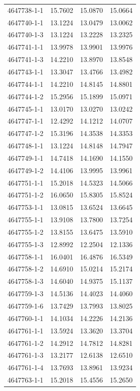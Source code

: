 \begin{longtable}{lrrr}
4647738-1-1 & 15.7602 & 15.0870 & 15.0664 \\
4647740-1-1 & 13.1224 & 13.0479 & 13.0062 \\
4647740-1-3 & 13.1224 & 13.2228 & 13.2325 \\
4647741-1-1 & 13.9978 & 13.9901 & 13.9976 \\
4647741-1-3 & 14.2210 & 13.8970 & 13.8548 \\
4647743-1-1 & 13.3047 & 13.4766 & 13.4982 \\
4647744-1-1 & 14.2210 & 14.8145 & 14.8801 \\
4647744-1-2 & 15.2956 & 15.1899 & 15.0971 \\
4647745-1-1 & 13.0170 & 13.0270 & 13.0242 \\
4647747-1-1 & 12.4292 & 14.1212 & 14.0707 \\
4647747-1-2 & 15.3196 & 14.3538 & 14.3353 \\
4647748-1-1 & 13.1224 & 14.8148 & 14.7947 \\
4647749-1-1 & 14.7418 & 14.1690 & 14.1550 \\
4647749-1-2 & 14.4106 & 13.9995 & 13.9961 \\
4647751-1-1 & 15.2018 & 14.5323 & 14.5066 \\
4647751-1-2 & 16.0650 & 15.8305 & 15.8524 \\
4647753-1-1 & 13.0815 & 13.6524 & 13.6645 \\
4647755-1-1 & 13.9108 & 13.7800 & 13.7254 \\
4647755-1-2 & 13.8155 & 13.6475 & 13.5910 \\
4647755-1-3 & 12.8992 & 12.2504 & 12.1336 \\
4647758-1-1 & 16.0401 & 16.4876 & 16.5349 \\
4647758-1-2 & 14.6910 & 15.0214 & 15.2174 \\
4647758-1-3 & 14.6040 & 14.9375 & 15.1137 \\
4647759-1-3 & 14.5136 & 14.4023 & 14.4060 \\
4647759-1-6 & 13.7429 & 13.7993 & 13.8025 \\
4647760-1-1 & 14.1034 & 14.2226 & 14.2136 \\
4647761-1-1 & 13.5924 & 13.3620 & 13.3704 \\
4647761-1-2 & 14.2912 & 14.7812 & 14.8281 \\
4647761-1-3 & 13.2177 & 12.6138 & 12.6510 \\
4647761-1-4 & 13.7693 & 13.8961 & 13.9234 \\
4647763-1-1 & 15.2018 & 15.4556 & 15.2650 \\

\end{longtable}
